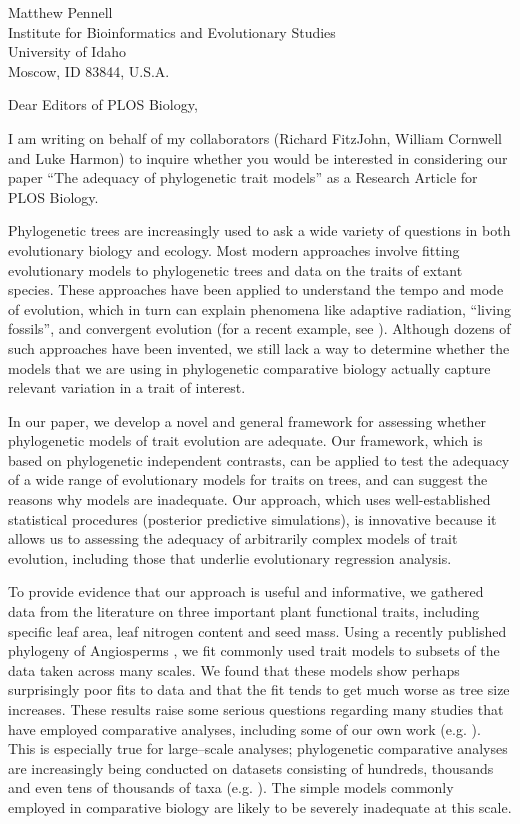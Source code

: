 \documentclass[a4paper,12pt]{article}
\begin{document}
{\raggedright
  Matthew Pennell\\
  Institute for Bioinformatics and Evolutionary Studies\\
  University of Idaho\\
 Moscow, ID 83844, U.S.A.\\[2ex]
}

\vspace{3ex}

Dear Editors of PLOS Biology,

I am writing on behalf of my collaborators (Richard FitzJohn, William Cornwell and Luke Harmon) to inquire whether you would be interested in considering our paper ``The adequacy of phylogenetic trait models'' as a Research Article for PLOS Biology. 

Phylogenetic trees are increasingly used to ask a wide variety of questions in both evolutionary biology and ecology. Most modern approaches involve fitting evolutionary models to phylogenetic trees and data on the traits of extant species. These approaches have been applied to understand the tempo and mode of evolution, which in turn can explain phenomena like adaptive radiation, ``living fossils'', and convergent evolution (for a recent example, see \citep{Mahler2013}). Although dozens of such approaches have been invented, we still lack a way to determine whether the models that we are using in phylogenetic comparative biology actually capture relevant variation in a trait of interest. 

In our paper, we develop a novel and general framework for assessing whether phylogenetic models of trait evolution are adequate.  Our framework, which is based on phylogenetic independent contrasts, can be applied to test the adequacy of a wide range of evolutionary models for traits on trees, and can suggest the reasons why models are inadequate. Our approach, which uses well-established statistical procedures (posterior predictive simulations), is innovative because it allows us to assessing the adequacy of arbitrarily complex models of trait evolution, including those that underlie evolutionary regression analysis.

To provide evidence that our approach is useful and informative, we gathered data from the literature on three important plant functional traits, including specific leaf area, leaf nitrogen content and seed mass. Using a recently published phylogeny of Angiosperms \citep{Zanne2013}, we fit commonly used trait models to subsets of the data taken across many scales. We found that these models show perhaps surprisingly poor fits to data and that the fit tends to get much worse as tree size increases. These results raise some serious questions regarding many studies that have employed comparative analyses, including some of our own work (e.g. \citep{Harmon2010}). This is especially true for large--scale analyses; phylogenetic comparative analyses are increasingly being conducted on datasets consisting of hundreds, thousands and even tens of thousands of taxa (e.g. \citep{Venditti2011, Rabosky2013}). The simple models commonly employed in comparative biology are likely to be severely inadequate at this scale. 
\end{document}
